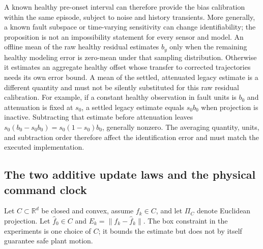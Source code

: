 A known healthy pre-onset interval can therefore provide the bias calibration
within the same episode, subject to noise and history transients. More generally,
a known fault subspace or time-varying sensitivity can change identifiability;
the proposition is not an impossibility statement for every sensor and model.
An offline mean of the raw healthy residual estimates $b_y$ only when the
remaining healthy modeling error is zero-mean under that sampling distribution.
Otherwise it estimates an aggregate healthy offset whose transfer to corrected
trajectories needs its own error bound. A mean of the settled, attenuated legacy
estimate is a different quantity and must not be silently substituted for this
raw residual calibration. For example, if a constant healthy observation in
fault units is $b_0$ and attenuation is fixed at $s_0$, a settled legacy
estimate equals $s_0b_0$ when projection is inactive. Subtracting that estimate
before attenuation leaves $s_0(b_0-s_0b_0)=s_0(1-s_0)b_0$, generally nonzero.
The averaging quantity, units, and subtraction order therefore affect the
identification error and must match the executed implementation.

\subsection{The two additive update laws and the physical command clock}

Let $C\subset\mathbb R^d$ be closed and convex, assume $f_k\in C$, and let
$\Pi_C$ denote Euclidean projection. Let $\widehat f_0\in C$ and
$E_k=\|f_k-\widehat f_k\|$. The box constraint in the experiments is one
choice of $C$; it bounds the estimate but does not by itself guarantee safe
plant motion.


